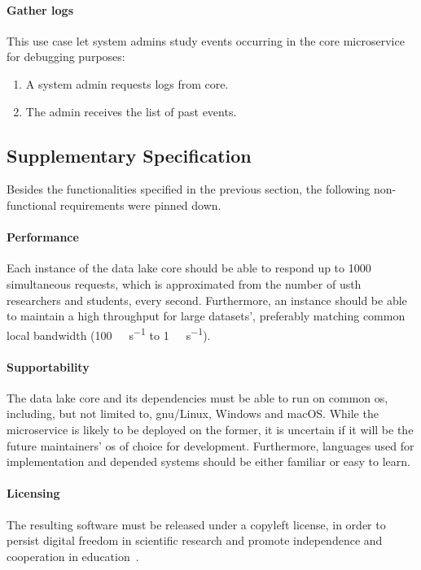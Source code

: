 \paragraph{Gather logs}  This use case let system admins study
events occurring in the core microservice for debugging purposes:
\begin{enumerate}
  \item A system admin requests logs from core.
  \item The admin receives the list of past events.
\end{enumerate}

\subsection{Supplementary Specification}
Besides the functionalities specified in the previous section,
the following non-functional requirements were pinned down.

\paragraph{Performance}  Each instance of the data lake core should be able
to respond up to 1000 simultaneous requests, which is approximated
from the number of \gls{usth} researchers and students, every second.
Furthermore, an instance should be able to maintain a high throughput
for large datasets', preferably matching common local bandwidth
(\SI{100}{\mega\bit\per\second} to \SI{1}{\giga\bit\per\second}).

\paragraph{Supportability}  The data lake core and its dependencies must
be able to run on common \gls{os}, including, but not limited to,
\acrshort{gnu}/Linux, Windows and macOS.  While the microservice is likely
to be deployed on the former, it is uncertain if it will be
the future maintainers' \gls{os} of choice for development.  Furthermore,
languages used for implementation and depended systems should be
either familiar or easy to learn.

\paragraph{Licensing}  The resulting software must be released under
a copyleft license, in order to persist digital freedom in scientific research
and promote independence and cooperation in education~\cite{libredu}.

